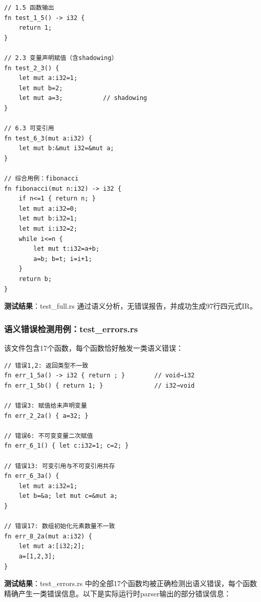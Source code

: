 \documentclass[12pt,a4paper]{ctexart}
\begin{document}
\begin{lstlisting}[language=RustLike, caption={test\_full.rs 中的关键函数示例}]
// 1.5 函数输出
fn test_1_5() -> i32 {
    return 1;
}

// 2.3 变量声明赋值（含shadowing）
fn test_2_3() {
    let mut a:i32=1;
    let mut b=2;
    let mut a=3;           // shadowing
}

// 6.3 可变引用
fn test_6_3(mut a:i32) {
    let mut b:&mut i32=&mut a;
}

// 综合用例：fibonacci
fn fibonacci(mut n:i32) -> i32 {
    if n<=1 { return n; }
    let mut a:i32=0;
    let mut b:i32=1;
    let mut i:i32=2;
    while i<=n {
        let mut t:i32=a+b;
        a=b; b=t; i=i+1;
    }
    return b;
}
\end{lstlisting}

\textbf{测试结果}：test\_full.rs 通过语义分析，无错误报告，并成功生成97行四元式IR。

\subsubsection{语义错误检测用例：test\_errors.rs}

该文件包含17个函数，每个函数恰好触发一类语义错误：

\begin{lstlisting}[language=RustLike, caption={test\_errors.rs 语义错误测试}]
// 错误1,2: 返回类型不一致
fn err_1_5a() -> i32 { return ; }        // void→i32
fn err_1_5b() { return 1; }              // i32→void

// 错误3: 赋值给未声明变量
fn err_2_2a() { a=32; }

// 错误6: 不可变变量二次赋值
fn err_6_1() { let c:i32=1; c=2; }

// 错误13: 可变引用与不可变引用共存
fn err_6_3a() {
    let mut a:i32=1;
    let b=&a; let mut c=&mut a;
}

// 错误17: 数组初始化元素数量不一致
fn err_8_2a(mut a:i32) {
    let mut a:[i32;2];
    a=[1,2,3];
}
\end{lstlisting}

\textbf{测试结果}：test\_errors.rs 中的全部17个函数均被正确检测出语义错误，每个函数精确产生一类错误信息。以下是实际运行时parser输出的部分错误信息：
\end{document}
